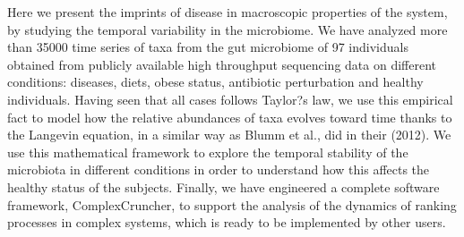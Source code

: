 Here we present the imprints of disease in macroscopic properties of the system, by studying the temporal variability in the microbiome. We have analyzed more than 35000 time series of taxa from the gut microbiome of 97 individuals obtained from publicly available high throughput sequencing data on different conditions: diseases, diets, obese status, antibiotic perturbation and healthy individuals. Having seen that all cases follows Taylor?s law, we use this empirical fact to model how the relative abundances of taxa evolves toward time thanks to the Langevin equation, in a similar way as Blumm et al., did in their (2012). We use this mathematical framework to explore the temporal stability of the microbiota in different conditions in order to understand how this affects the healthy status of the subjects. Finally, we have engineered a complete software framework, ComplexCruncher, to support the analysis of the dynamics of ranking processes in complex systems, which is ready to be implemented by other users.